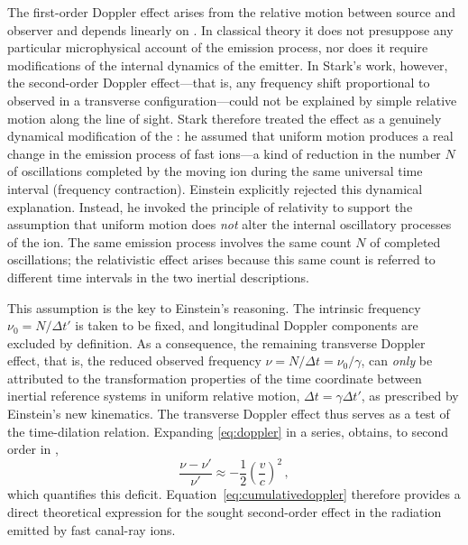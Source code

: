 \documentclass[pdflatex]{sn-jnl}
\newcommand{\tDe}{transverse Doppler effect\xspace}
\begin{document}



The first-order Doppler effect arises from the relative motion between source and observer and depends linearly on \betafactorh. In classical theory it does not presuppose any particular microphysical account of the emission process, nor does it require modifications of the internal dynamics of the emitter. In Stark’s work, however, the second-order Doppler effect---that is, any frequency shift proportional to \betafactorsquaredh observed in a transverse configuration---could not be explained by simple relative motion along the line of sight. Stark therefore treated the effect as a genuinely dynamical modification of the : he assumed that uniform motion produces a real change in the emission process of fast ions---a kind of reduction in the number $N$ of oscillations completed by the moving ion during the same universal time interval (frequency contraction). Einstein explicitly rejected this dynamical explanation. Instead, he invoked the principle of relativity to support the assumption that uniform motion does \emph{not} alter the internal oscillatory processes of the ion. The same emission process involves the same count $N$ of completed oscillations; the relativistic effect arises because this same count is referred to different time intervals in the two inertial descriptions.


This assumption is the key to Einstein’s reasoning. The intrinsic frequency $\nu_0=N/\Delta t'$ is taken to be fixed, and longitudinal Doppler components are excluded by definition. As a consequence, the remaining transverse Doppler effect, that is, the reduced observed frequency $\nu = N/\Delta t = \nu_0/\gamma$, can \emph{only} be attributed to the transformation properties of the time coordinate between inertial reference systems in uniform relative motion, $\Delta t=\gamma\Delta t'$, as prescribed by Einstein’s new kinematics. The \tDe thus serves as a test of the time-dilation relation. Expanding \cref{eq:doppler} in a series, \citet[197]{Einstein1907d} obtains, to second order in \betafactorh,
%
\begin{equation}\label{eq:cumulativedoppler}
\frac{\nu-\nu'}{\nu'} \approx -\frac{1}{2}\left(\frac{v}{c}\right)^2\,,
\end{equation}
%
which quantifies this deficit. Equation~\eqref{eq:cumulativedoppler} therefore provides a direct theoretical expression for the sought second-order effect in the radiation emitted by fast canal-ray ions.
\end{document}
